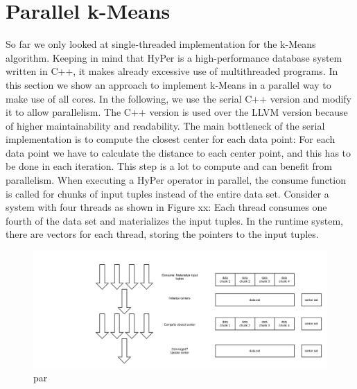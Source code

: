 \section{Parallel k-Means}

So far we only looked at single-threaded implementation for the k-Means algorithm. Keeping in mind that HyPer is a high-performance database system written in C++, it makes already excessive use of multithreaded programs. In this section we show an approach to implement k-Means in a parallel way to make use of all cores. 
In the following, we use the serial C++ version and modify it to allow parallelism. The C++ version is used over the LLVM version because of higher maintainability and readability. The main bottleneck of the serial implementation is to compute the closest center for each data point: For each data point we have to calculate the distance to each center point, and this has to be done in each iteration. This step is a lot to compute and can benefit from parallelism.
When executing a HyPer operator in parallel, the consume function is called for chunks of input tuples instead of the entire data set. Consider a system with four threads as shown in Figure xx: Each thread consumes one fourth of the data set and materializes the input tuples. In the runtime system, there are vectors for each thread, storing the pointers to the input tuples. 


\begin{figure}[htsb]
  \centering
  \includegraphics[scale=0.3]{figures/parallel}
  \caption[par]{par}
  \label{fig:parallel}
\end{figure}

